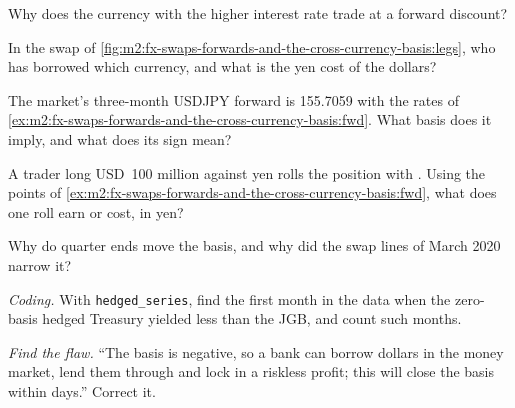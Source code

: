 \begin{exercise}[$\star$]\label{exo:m2:fx-swaps-forwards-and-the-cross-currency-basis:2}
Why does the currency with the higher interest rate trade at a forward discount?
\end{exercise}

\begin{exercise}[$\star$]\label{exo:m2:fx-swaps-forwards-and-the-cross-currency-basis:3}
In the swap of \cref{fig:m2:fx-swaps-forwards-and-the-cross-currency-basis:legs},
who has borrowed which currency, and what is the yen cost of the dollars?
\end{exercise}

\begin{exercise}[$\star\star$]\label{exo:m2:fx-swaps-forwards-and-the-cross-currency-basis:4}
The market's three-month USDJPY forward is 155.7059 with the rates of
\cref{ex:m2:fx-swaps-forwards-and-the-cross-currency-basis:fwd}. What basis does
it imply, and what does its sign mean?
\end{exercise}

\begin{exercise}[$\star\star$]\label{exo:m2:fx-swaps-forwards-and-the-cross-currency-basis:5}
A trader long USD~100 million against yen rolls the position with .
Using the  points of \cref{ex:m2:fx-swaps-forwards-and-the-cross-currency-basis:fwd},
what does one roll earn or cost, in yen?
\end{exercise}

\begin{exercise}[$\star\star$]\label{exo:m2:fx-swaps-forwards-and-the-cross-currency-basis:6}
Why do quarter ends move the basis, and why did the swap lines of March 2020
narrow it?
\end{exercise}

\begin{exercise}[$\star\star\star$]\label{exo:m2:fx-swaps-forwards-and-the-cross-currency-basis:7}
\emph{Coding.} With \texttt{hedged\_series}, find the first month in the data
when the zero-basis hedged Treasury yielded less than the JGB, and count such
months.
\end{exercise}

\begin{exercise}[$\star\star\star$]\label{exo:m2:fx-swaps-forwards-and-the-cross-currency-basis:8}
\emph{Find the flaw.} ``The basis is negative, so a bank can borrow dollars in
the money market, lend them through  and lock in a riskless profit;
this will close the basis within days.'' Correct it.
\end{exercise}

